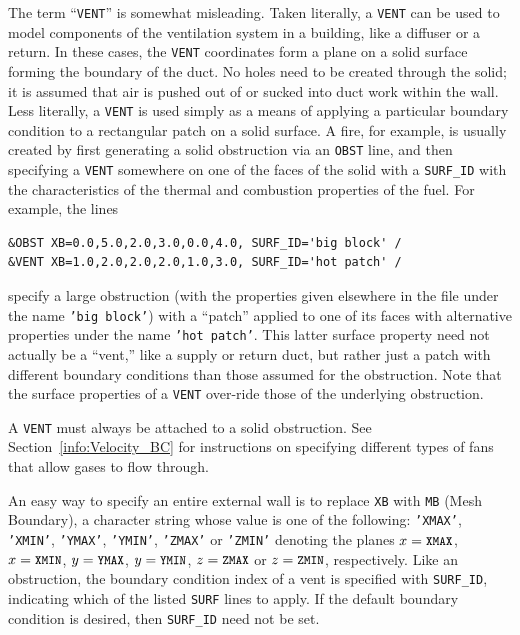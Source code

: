 \documentclass[11pt]{book}
\newcommand{\ct}{\tt\small}
\begin{document}
\noindent The term ``{\ct VENT}'' is somewhat misleading. Taken literally, a
{\ct VENT} can be used to model components of the ventilation system in
a building, like a diffuser or a return.
In these cases, the {\ct VENT} coordinates form a plane on a
solid surface forming the boundary of the duct.
No holes need to be created through the solid; it is
assumed that air is pushed out of or sucked into duct work within the
wall. Less literally, a {\ct VENT} is used simply as a means of applying
a particular boundary condition to a rectangular patch on a solid surface.
A fire, for example, is usually created by first generating a solid
obstruction via an {\ct OBST} line, and then specifying a {\ct VENT}
somewhere on one of the faces of the solid with a {\ct SURF\_ID}
with the characteristics of the thermal and combustion properties of the fuel.
For example, the lines

\footnotesize
\begin{verbatim}
&OBST XB=0.0,5.0,2.0,3.0,0.0,4.0, SURF_ID='big block' /
&VENT XB=1.0,2.0,2.0,2.0,1.0,3.0, SURF_ID='hot patch' /
\end{verbatim} \normalsize

\noindent
specify a large obstruction (with the properties given elsewhere in the file under the name {\ct 'big block'}) with
a ``patch'' applied to one of its faces with alternative properties under the name {\ct 'hot patch'}. This latter
surface property need not actually be a ``vent,'' like a supply or return duct, but rather just a patch with different boundary
conditions than those assumed for the obstruction. Note that the surface properties of a {\ct VENT} over-ride those of the
underlying obstruction.

\begin{warning}
A {\ct VENT} must always be attached to a solid obstruction. See
Section~\ref{info:Velocity_BC} for instructions on specifying different types of fans that allow gases to flow through.
\end{warning}

\noindent
An easy way to specify an entire external wall is to replace {\ct XB} with
{\ct MB} (Mesh Boundary), a character string whose value is one of the following:
{\ct 'XMAX'}, {\ct 'XMIN'}, {\ct 'YMAX'}, {\ct 'YMIN'}, {\ct 'ZMAX'} or
{\ct 'ZMIN'} denoting the planes $x=\hbox{\ct XMAX}$, $x=\hbox{\ct XMIN}$,
$y=\hbox{\ct YMAX}$, $y=\hbox{\ct YMIN}$, $z=\hbox{\ct ZMAX}$
or $z=\hbox{\ct ZMIN}$, respectively.
Like an obstruction, the boundary condition index of a vent is specified
with {\ct SURF\_ID}, indicating which of the listed {\ct SURF} lines to
apply. If the default boundary condition is desired, then {\ct SURF\_ID} need not be set.
\end{document}
